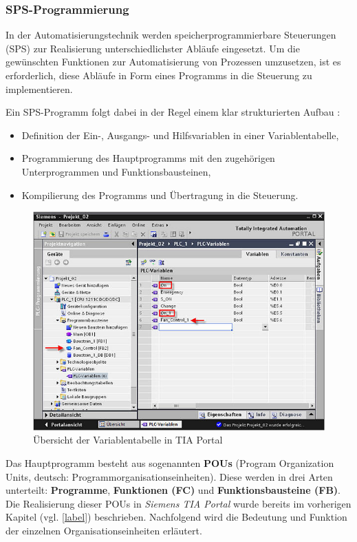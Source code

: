 \subsubsection{SPS-Programmierung}
In der Automatisierungstechnik werden speicherprogrammierbare Steuerungen (SPS) zur Realisierung unterschiedlichster Abläufe eingesetzt.  
Um die gewünschten Funktionen zur Automatisierung von Prozessen umzusetzen, ist es erforderlich, diese Abläufe in Form eines Programms in die Steuerung zu implementieren.

Ein SPS-Programm folgt dabei in der Regel einem klar strukturierten Aufbau \cite{Seitz.2021}:
\begin{itemize}
	\item Definition der Ein-, Ausgangs- und Hilfsvariablen in einer Variablentabelle,
	\item Programmierung des Hauptprogramms mit den zugehörigen Unterprogrammen und Funktionsbausteinen,
	\item Kompilierung des Programms und Übertragung in die Steuerung.
\end{itemize}

\begin{figure}[H]
	\centering
	\includegraphics[width=0.8\linewidth]{images/Variablentabelle.jpg}
	\caption{Übersicht der Variablentabelle in TIA Portal \cite{siemens_vars2024}}
	\label{fig:uebersicht_tia}
\end{figure}

Das Hauptprogramm besteht aus sogenannten \textbf{POUs} (Program Organization Units, deutsch: Programmorganisationseinheiten).  
Diese werden in drei Arten unterteilt: \textbf{Programme}, \textbf{Funktionen (FC)} und \textbf{Funktionsbausteine (FB)}.  
Die Realisierung dieser POUs in \textit{Siemens TIA Portal} wurde bereits im vorherigen Kapitel (vgl. \ref{label}) beschrieben.  
Nachfolgend wird die Bedeutung und Funktion der einzelnen Organisationseinheiten erläutert.

